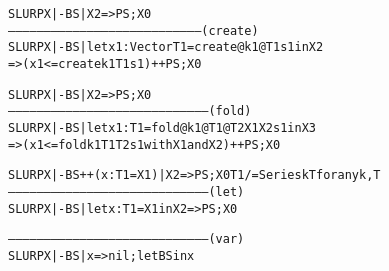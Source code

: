\begin{alltt}
     SLURPX|- BS | X2 => PS ; X0
   -------------------------------------------------------------------------------- (create)
     SLURPX|- BS | let x1 : Vector T1    = create @k1 @T1 s1         in X2
           =>                       (x1 <= create k1 T1 s1)          ++ PS ; X0

     SLURPX|- BS | X2 => PS ; X0
   ------------------------------------------------------------------------------------ (fold)
     SLURPX|- BS | let x1 : T1 = fold @k1 @T1 @T2 X1 X2 s1 in X3
           =>             (x1 <= fold  k1  T1  T2 s1 with X1 and X2) ++ PS ; X0

     SLURPX|- BS ++ (x : T1 = X1) | X2 => PS ; X0      T1 /= Series k T  for any  k, T
   ------------------------------------------------------------------------------------ (let)
     SLURPX|- BS | let x : T1 = X1 in X2 => PS ; X0

   ------------------------------------------------------------------------------------ (var)
     SLURPX|- BS | x  => nil ; let BS in x
\end{alltt}
